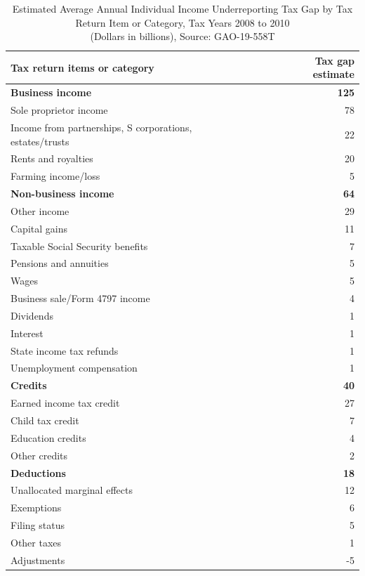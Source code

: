 \documentclass[12pt]{article}
\begin{document}
\begin{table}[htbp]
\centering
\caption{Estimated Average Annual Individual Income Underreporting Tax Gap by Tax Return Item or Category, Tax Years 2008 to 2010\\
(Dollars in billions), Source: GAO-19-558T}
\begin{threeparttable}
\begin{tabular}{@{}llr@{}}
\toprule
\textbf{Tax return items or category} & & \textbf{Tax gap estimate} \\ 
\midrule
\textbf{Business income} & & \textbf{125} \\
\quad Sole proprietor income & & 78 \\
\quad Income from partnerships, S corporations, estates/trusts & & 22 \\
\quad Rents and royalties & & 20 \\
\quad Farming income/loss & & 5 \\[2pt]
\textbf{Non-business income} & & \textbf{64} \\
\quad Other income\tnote{a} & & 29 \\
\quad Capital gains & & 11 \\
\quad Taxable Social Security benefits & & 7 \\
\quad Pensions and annuities & & 5 \\
\quad Wages & & 5 \\
\quad Business sale/Form 4797 income & & 4 \\
\quad Dividends & & 1 \\
\quad Interest & & 1 \\
\quad State income tax refunds & & 1 \\
\quad Unemployment compensation & & 1 \\[2pt]
\textbf{Credits} & & \textbf{40} \\
\quad Earned income tax credit & & 27 \\
\quad Child tax credit & & 7 \\
\quad Education credits & & 4 \\
\quad Other credits & & 2 \\[2pt]
\textbf{Deductions} & & \textbf{18} \\
\quad Unallocated marginal effects \tnote{b} & & 12 \\
\quad Exemptions & & 6 \\
\quad Filing status & & 5 \\
\quad Other taxes & & 1 \\
\quad Adjustments\tnote{c} & & -5 \\[4pt]

\end{tabular}
\end{threeparttable}
\end{table}
\end{document}

